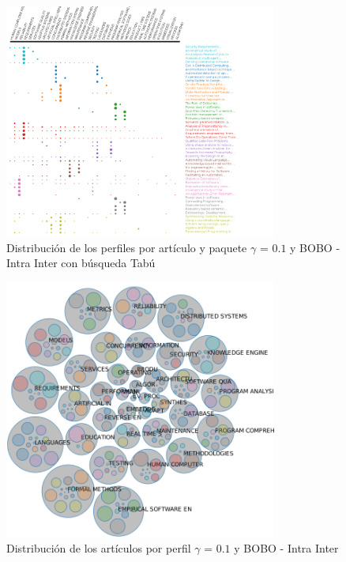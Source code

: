 \begin{figure}[H]
  \centering
    \includegraphics[width=0.8\textwidth]{resultados/papers/BOBO/INTRA_INTER/gamma-with-local-01.png}
  \caption{Distribución de los perfiles por artículo y paquete $\gamma$ = $0.1$ y BOBO - Intra Inter con búsqueda Tabú}
  \label{res:img-papers-gamma01-bobo-intra-inter-tabu}
\end{figure}

\begin{figure}[H]
  \centering
    \includegraphics[width=0.8\textwidth]{resultados/papers/BOBO/INTRA_INTER/bubbles-gamma-01.png}
  \caption{Distribución de los artículos por perfil $\gamma$ = $0.1$ y BOBO - Intra Inter}
  \label{res:img-papers-bubbles-gamma01-bobo-intra-inter}
\end{figure}

